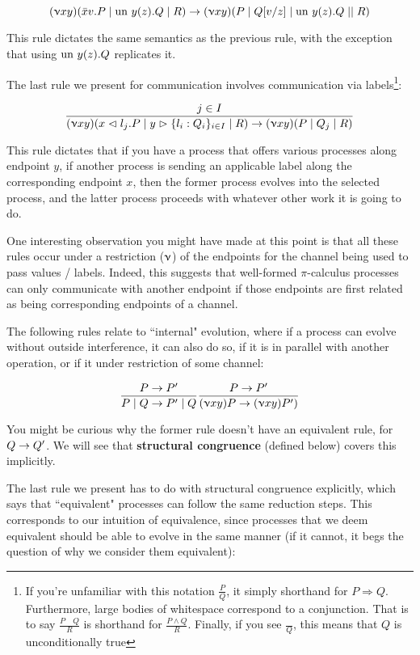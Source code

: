 $$(\upnu xy)(\bar{x}v.P \mid \text{un } y(z).Q \mid R) \rightarrow (\upnu xy)(P \mid Q[v/z]\mid \text{un } y(z).Q \mid \mid R)$$

This rule dictates the same semantics as the previous rule, with the exception that using $\text{un } y(z).Q$ replicates it.

The last rule we present for communication involves communication via labels\footnote{If you're unfamiliar with this notation $\frac{P}{Q}$, it simply shorthand for $P \Rightarrow Q$. Furthermore, large bodies of whitespace correspond to a conjunction. That is to say $\frac{P \quad Q}{R}$ is shorthand for $\frac{P \land Q}{R}$. Finally, if you see $\frac{}{Q}$, this means that $Q$ is unconditionally true}:

$$\frac{j \in I}{(\upnu xy)(x \vartriangleleft l_j . P \mid y \vartriangleright \{l_i : Q_i\}_{i \in I} \mid R) \rightarrow (\upnu xy)(P \mid Q_j \mid R)}$$

This rule dictates that if you have a process that offers various processes along endpoint $y$, if another process is sending an applicable label along the corresponding endpoint $x$, then the former process evolves into the selected process, and the latter process proceeds with whatever other work it is going to do.

One interesting observation you might have made at this point is that all these rules occur under a restriction ($\upnu$) of the endpoints for the channel being used to pass values / labels. Indeed, this suggests that well-formed $\pi$-calculus processes can only communicate with another endpoint if those endpoints are first related as being corresponding endpoints of a channel.

The following rules relate to ``internal" evolution, where if a process can evolve without outside interference, it can also do so, if it is in parallel with another operation, or if it under restriction of some channel:

$$
\frac{P \rightarrow P'}{P \mid Q \rightarrow P' \mid Q} \\
\frac{P \rightarrow P'}{(\upnu xy)P \rightarrow (\upnu xy) P')}
$$

You might be curious why the former rule doesn't have an equivalent rule, for $Q \rightarrow Q'$. We will see that \textbf{structural congruence} (defined below) covers this implicitly.

The last rule we present has to do with structural congruence explicitly, which says that ``equivalent" processes can follow the same reduction steps. This corresponds to our intuition of equivalence, since processes that we deem equivalent should be able to evolve in the same manner (if it cannot, it begs the question of why we consider them equivalent):

